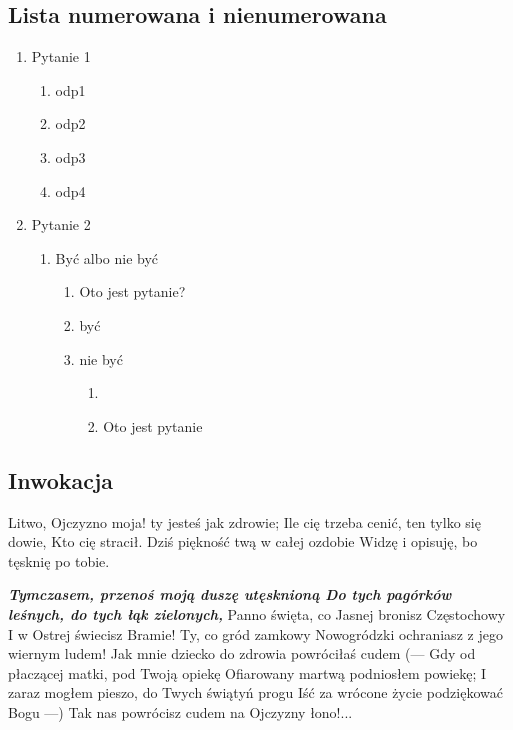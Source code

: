\subsection{Lista numerowana i nienumerowana}

\begin{enumerate}
    \item Pytanie 1
    \begin{enumerate}
        \item odp1
        \item odp2
        \item odp3
        \item odp4
    \end{enumerate}
    \item Pytanie 2
    \begin{enumerate}
        \item Być albo nie być
        \begin{enumerate}
            \item Oto jest pytanie?
            \item być
            \item nie być
            \begin{enumerate}
                \item \item Oto jest pytanie
            \end{enumerate}
        \end{enumerate}
    \end{enumerate}
\end{enumerate}

\subsection{Inwokacja}

Litwo, Ojczyzno moja! ty jesteś jak zdrowie;
Ile cię trzeba cenić, ten tylko się dowie,
Kto cię stracił. Dziś piękność twą w całej ozdobie
Widzę i opisuję, bo tęsknię po tobie.

\textbf{\textit{Tymczasem, przenoś moją duszę utęsknioną
Do tych pagórków leśnych, do tych łąk zielonych,}}
Panno święta, co Jasnej bronisz Częstochowy
I w Ostrej świecisz Bramie! Ty, co gród zamkowy
Nowogródzki ochraniasz z jego wiernym ludem!
Jak mnie dziecko do zdrowia powróciłaś cudem
(— Gdy od płaczącej matki, pod Twoją opiekę
Ofiarowany martwą podniosłem powiekę;
I zaraz mogłem pieszo, do Twych świątyń progu
Iść za wrócone życie podziękować Bogu —)
Tak nas powrócisz cudem na Ojczyzny łono!...

